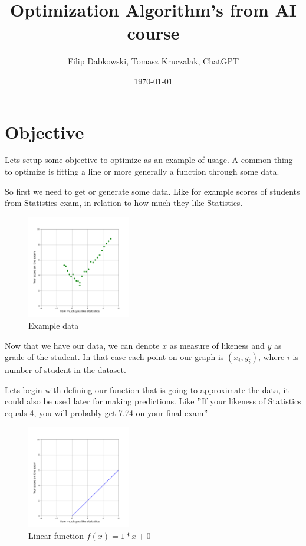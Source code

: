 \documentclass{article}
\title{Optimization Algorithm's from AI course}
\author{Filip Dabkowski, Tomasz Kruczalak, ChatGPT}
\date{\today}
\begin{document}
    \maketitle


    \section{Objective}
    Lets setup some objective to optimize as an example of usage.
    A common thing to optimize is fitting a line or more generally a function through some data.\newline

    So first we need to get or generate some data.
    Like for example scores of students from Statistics exam, in relation to how much they like Statistics.
    \begin{figure}[h]
        \centering
        \includegraphics[width=0.4\textwidth]{../images/myplot1.png}
        \caption{Example data}
        \label{fig:data}
    \end{figure}

    Now that we have our data, we can denote $x$ as measure of likeness and $y$ as grade of the student.
    In that case each point on our graph is $(x_i, y_i)$, where $i$ is number of student in the dataset.

    \break

    Lets begin with defining our function that is going to approximate the data, it could also be used later for making predictions.
    Like \("\)If your likeness of Statistics equals 4, you will probably get 7.74 on your final exam\("\)

    \begin{figure}[h]
        \centering
        \includegraphics[width=0.4\textwidth]{../images/myplot2.png}
        \caption{Linear function $f(x) = 1 * x + 0$}
        \label{fig:data_line}
    \end{figure}
\end{document}
